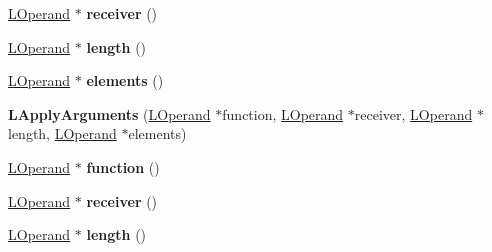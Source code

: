 \begin{DoxyCompactItemize}
\item 
\hyperlink{classv8_1_1internal_1_1_l_operand}{L\+Operand} $\ast$ {\bfseries receiver} ()\hypertarget{classv8_1_1internal_1_1_l_apply_arguments_a6cd58169b6ce998cb4a7fadaebdf8ae5}{}\label{classv8_1_1internal_1_1_l_apply_arguments_a6cd58169b6ce998cb4a7fadaebdf8ae5}

\item 
\hyperlink{classv8_1_1internal_1_1_l_operand}{L\+Operand} $\ast$ {\bfseries length} ()\hypertarget{classv8_1_1internal_1_1_l_apply_arguments_a7184d82b892039d6cd4cae3b4d9f3f9d}{}\label{classv8_1_1internal_1_1_l_apply_arguments_a7184d82b892039d6cd4cae3b4d9f3f9d}

\item 
\hyperlink{classv8_1_1internal_1_1_l_operand}{L\+Operand} $\ast$ {\bfseries elements} ()\hypertarget{classv8_1_1internal_1_1_l_apply_arguments_acb08ae582ad76ef25684e2361409c0e4}{}\label{classv8_1_1internal_1_1_l_apply_arguments_acb08ae582ad76ef25684e2361409c0e4}

\item 
{\bfseries L\+Apply\+Arguments} (\hyperlink{classv8_1_1internal_1_1_l_operand}{L\+Operand} $\ast$function, \hyperlink{classv8_1_1internal_1_1_l_operand}{L\+Operand} $\ast$receiver, \hyperlink{classv8_1_1internal_1_1_l_operand}{L\+Operand} $\ast$length, \hyperlink{classv8_1_1internal_1_1_l_operand}{L\+Operand} $\ast$elements)\hypertarget{classv8_1_1internal_1_1_l_apply_arguments_a03722f1b30078ec905687e48dd73c80d}{}\label{classv8_1_1internal_1_1_l_apply_arguments_a03722f1b30078ec905687e48dd73c80d}

\item 
\hyperlink{classv8_1_1internal_1_1_l_operand}{L\+Operand} $\ast$ {\bfseries function} ()\hypertarget{classv8_1_1internal_1_1_l_apply_arguments_af7fa90a86d06b14c9991f9c68115415b}{}\label{classv8_1_1internal_1_1_l_apply_arguments_af7fa90a86d06b14c9991f9c68115415b}

\item 
\hyperlink{classv8_1_1internal_1_1_l_operand}{L\+Operand} $\ast$ {\bfseries receiver} ()\hypertarget{classv8_1_1internal_1_1_l_apply_arguments_a6cd58169b6ce998cb4a7fadaebdf8ae5}{}\label{classv8_1_1internal_1_1_l_apply_arguments_a6cd58169b6ce998cb4a7fadaebdf8ae5}

\item 
\hyperlink{classv8_1_1internal_1_1_l_operand}{L\+Operand} $\ast$ {\bfseries length} ()\hypertarget{classv8_1_1internal_1_1_l_apply_arguments_a7184d82b892039d6cd4cae3b4d9f3f9d}{}\label{classv8_1_1internal_1_1_l_apply_arguments_a7184d82b892039d6cd4cae3b4d9f3f9d}


\end{DoxyCompactItemize}
